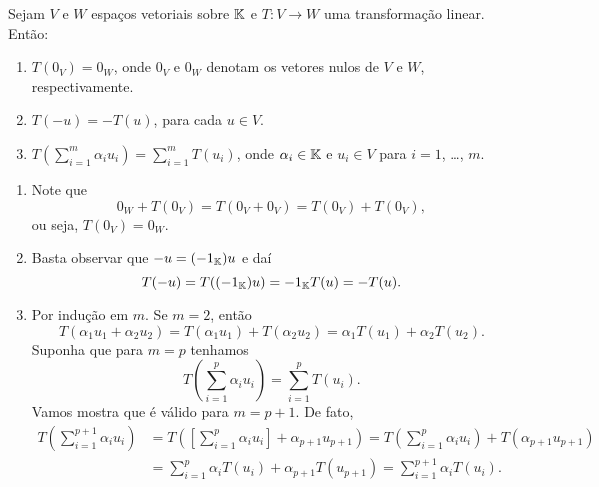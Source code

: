 \begin{lema}
	Sejam $V$ e $W$ espaços vetoriais sobre $\mathbb{K}$ e $T : V \to W$ uma transformação linear. Então:
	\begin{enumerate}\label{transformacao_linear_propriedades_basicas}
		\item $T(0_V) = 0_W$, onde $0_V$ e $0_W$ denotam os vetores nulos de $V$ e $W$, respectivamente.

		\item $T(-u) = -T(u)$, para cada $u \in V$.

		\item $T(\sum_{i=1}^m\alpha_iu_i) = \sum_{i=1}^mT(u_i)$, onde $\alpha_i \in \mathbb{K}$ e $u_i \in V$ para $i = 1$, \dots, $m$.
	\end{enumerate}
\end{lema}
\begin{prova}
	\begin{enumerate}
		\item Note que
		\[
			0_W + T(0_V) = T(0_V + 0_V) = T(0_V) + T(0_V),
		\]
		ou seja, $T(0_V) = 0_W$.

		\item Basta observar que $-u = (-1_{\mathbb{K}})u$ e daí
		\[
			T(-u) = T((-1_{\mathbb{K}})u) = -1_{\mathbb{K}}T(u) = -T(u).
		\]

		\item Por indução em $m$. Se $m = 2$, então
		\[
			T(\alpha_1u_1 + \alpha_2u_2) = T(\alpha_1u_1) + T(\alpha_2u_2) = \alpha_1T(u_1) + \alpha_2T(u_2).
		\]
		Suponha que para $m = p$ tenhamos
		\[
			T(\sum_{i=1}^p\alpha_iu_i) = \sum_{i=1}^pT(u_i).
		\]
		Vamos mostra que é válido para $m = p + 1$. De fato,
		\begin{align*}
			T(\sum_{i=1}^{p+1}\alpha_iu_i) &= T([\sum_{i=1}^p\alpha_iu_i] + \alpha_{p + 1}u_{p + 1}) = T(\sum_{i=1}^p\alpha_iu_i) + T(\alpha_{p+1}u_{p+1}) \\ &= \sum_{i=1}^p\alpha_iT(u_i) + \alpha_{p+1}T(u_{p+1}) = \sum_{i=1}^{p+1}\alpha_iT(u_i).
		\end{align*}
	\end{enumerate}
\end{prova}

